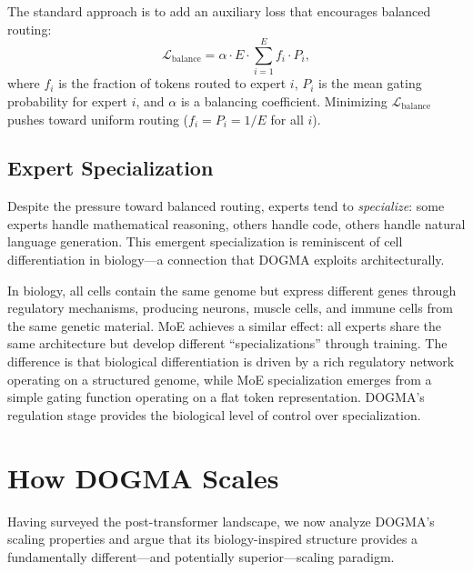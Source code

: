 The standard approach is to add an auxiliary loss that encourages balanced routing:
\begin{equation}
\mathcal{L}_{\text{balance}} = \alpha \cdot E \cdot \sum_{i=1}^{E} f_i \cdot P_i,
\label{eq:load-balance}
\end{equation}
where $f_i$ is the fraction of tokens routed to expert $i$, $P_i$ is the mean gating probability for expert $i$, and $\alpha$ is a balancing coefficient. Minimizing $\mathcal{L}_{\text{balance}}$ pushes toward uniform routing ($f_i = P_i = 1/E$ for all $i$).

\subsection{Expert Specialization}

Despite the pressure toward balanced routing, experts tend to \emph{specialize}: some experts handle mathematical reasoning, others handle code, others handle natural language generation. This emergent specialization is reminiscent of cell differentiation in biology---a connection that DOGMA exploits architecturally.

\begin{bioinsight}
In biology, all cells contain the same genome but express different genes through regulatory mechanisms, producing neurons, muscle cells, and immune cells from the same genetic material. MoE achieves a similar effect: all experts share the same architecture but develop different ``specializations'' through training. The difference is that biological differentiation is driven by a rich regulatory network operating on a structured genome, while MoE specialization emerges from a simple gating function operating on a flat token representation. DOGMA's regulation stage provides the biological level of control over specialization.
\end{bioinsight}

\section{How DOGMA Scales}
\label{sec:scaling-dogma}

Having surveyed the post-transformer landscape, we now analyze DOGMA's scaling properties and argue that its biology-inspired structure provides a fundamentally different---and potentially superior---scaling paradigm.

